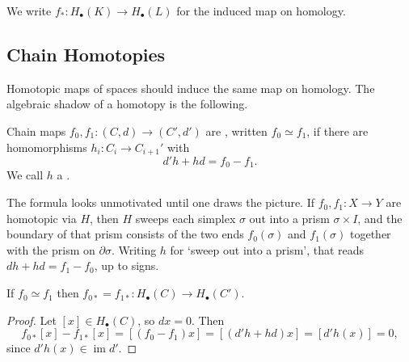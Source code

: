 We write $f_* : H_\bullet(K)\to H_\bullet(L)$ for the induced map on homology.

\subsection{Chain Homotopies}

Homotopic maps of spaces should induce the same map on homology. The algebraic shadow of
a homotopy is the following.

\begin{definition}
	Chain maps $f_0, f_1: (C,d)\to(C',d')$ are , written $f_0 \simeq f_1$, if there are homomorphisms $h_i: C_i \to C_{i+1}'$ with
	$$
	d'h + hd = f_0 - f_1 .
	$$
	We call $h$ a .
\end{definition}

The formula looks unmotivated until one draws the picture. If $f_0, f_1: X \to Y$ are
homotopic via $H$, then $H$ sweeps each simplex $\sigma$ out into a prism
$\sigma \times I$, and the boundary of that prism consists of the two ends $f_0(\sigma)$
and $f_1(\sigma)$ together with the prism on $\partial\sigma$. Writing $h$ for `sweep out
into a prism', that reads $dh + hd = f_1 - f_0$, up to signs.

\begin{center}
\end{center}

\begin{lemma} \label{lem:chain-homotopy}
	If $f_0 \simeq f_1$ then $f_{0*} = f_{1*}: H_\bullet(C)\to H_\bullet(C')$.
\end{lemma}
\begin{proof}
	Let $[x]\in H_\bullet(C)$, so $dx = 0$. Then
	$$
	f_{0*}[x]-f_{1*}[x] = [(f_0-f_1)x] = [(d'h+hd)x] = [d'h(x)] = 0,
	$$
	since $d'h(x) \in \operatorname{im}d'$.
\end{proof}

